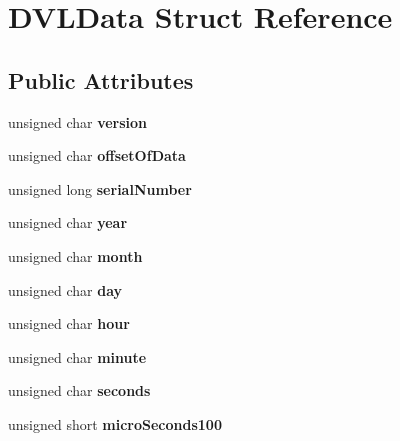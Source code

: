 \hypertarget{structDVLData}{}\section{D\+V\+L\+Data Struct Reference}
\label{structDVLData}
\subsection*{Public Attributes}
\begin{DoxyCompactItemize}
\item 
\mbox{\label{structDVLData_a0c22a8518847aaa2e3a7b9ebddec7140}} 
unsigned char {\bfseries version}
\item 
\mbox{\label{structDVLData_a0dcf730c3f314b8e9995f09271ea429f}} 
unsigned char {\bfseries offset\+Of\+Data}
\item 
\mbox{\label{structDVLData_a52e5848fb99287368ad0197f9bbbf933}} 
unsigned long {\bfseries serial\+Number}
\item 
\mbox{\label{structDVLData_a7dbf5221a4979d8f9d9247b7de685ceb}} 
unsigned char {\bfseries year}
\item 
\mbox{\label{structDVLData_a88bd22c3211688a07a9a2fa38f5920b8}} 
unsigned char {\bfseries month}
\item 
\mbox{\label{structDVLData_a9ed16962bfebc258033a99e0131c7acc}} 
unsigned char {\bfseries day}
\item 
\mbox{\label{structDVLData_ad850cc99098e5ce79835d0fe3f097526}} 
unsigned char {\bfseries hour}
\item 
\mbox{\label{structDVLData_a03deb0b38a326c68398a69b1fede89be}} 
unsigned char {\bfseries minute}
\item 
\mbox{\label{structDVLData_a3839b3107d362771464c8cd0272e2273}} 
unsigned char {\bfseries seconds}
\item 
\mbox{\label{structDVLData_ac073304da623aa9e7eb1d2c9d9e40a18}} 
unsigned short {\bfseries micro\+Seconds100}

\end{DoxyCompactItemize}
